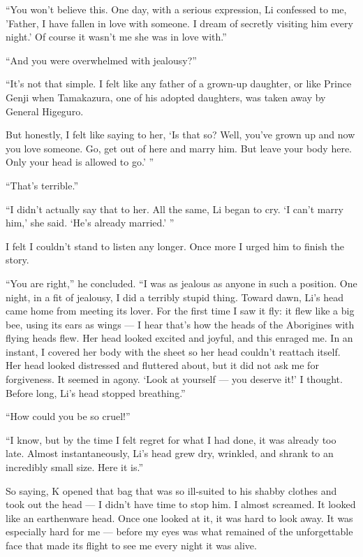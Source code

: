 \documentclass[a6paper]{article}
\begin{document}
“You won't believe this.  One day, with a serious expression,
Li confessed to me, 'Father, I have fallen in love with
someone.  I dream of secretly visiting him every night.'  Of
course it wasn't me she was in love with.”

“And you were overwhelmed with jealousy?”

“It's not that simple.  I felt like any father of a grown-up
daughter, or like Prince Genji when Tamakazura, one of his
adopted daughters, was taken away by General Higeguro.

But honestly, I felt like saying to her, `Is that so?  Well,
you've grown up and now you love someone.  Go, get out of
here and marry him.  But leave your body here.  Only your
head is allowed to go.' ”

“That's terrible.”

“I didn't actually say that to her.  All the same, Li began to
cry.  `I can't marry him,' she said.  `He's already married.' ”

I felt I couldn't stand to listen any longer.  Once more I
urged him to ﬁnish the story.

“You are right,” he concluded.  “I was as jealous as anyone
in such a position.  One night, in a fit of jealousy, I did a
terribly stupid thing.  Toward dawn, Li's head came home
from meeting its lover.  For the ﬁrst time I saw it fly: it ﬂew
like a big bee, using its ears as wings --- I hear that's how the
heads of the Aborigines with ﬂying heads flew.  Her head
looked excited and joyful, and this enraged me.  In an instant,
I covered her body with the sheet so her head couldn't
reattach itself.  Her head looked distressed and fluttered
about, but it did not ask me for forgiveness.  It seemed in
agony.  `Look at yourself --- you deserve it!' I thought.  Before
long, Li's head stopped breathing.”

“How could you be so cruel!”

“I know, but by the time I felt regret for what I had done,
it was already too late.  Almost instantaneously, Li's head
grew dry, wrinkled, and shrank to an incredibly small size.
Here it is.”

So saying, K opened that bag that was so ill-suited to his
shabby clothes and took out the head --- I didn't have time to
stop him.  I almost screamed.  It looked like an earthenware
head.  Once one looked at it, it was hard to look away.  It
was especially hard for me --- before my eyes was what remained
of the unforgettable face that made its ﬂight to see
me every night it was alive.
\end{document}
